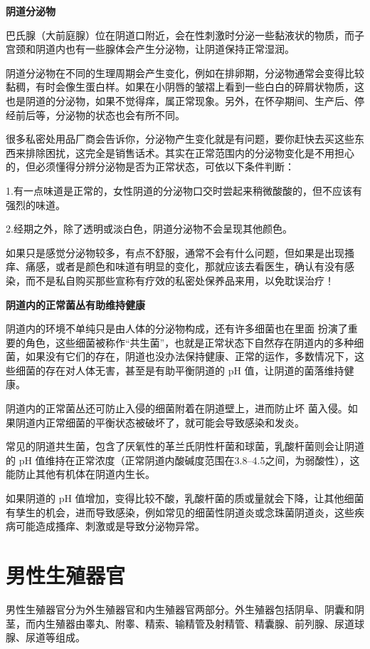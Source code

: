 \documentclass[12pt,UTF8]{ctexbook}
\begin{document}
\textbf{阴道分泌物}

巴氏腺（大前庭腺）位在阴道口附近，会在性刺激时分泌一些黏液状的物质，而子宫颈和阴道内也有一些腺体会产生分泌物，让阴道保持正常湿润。

阴道分泌物在不同的生理周期会产生变化，例如在排卵期，分泌物通常会变得比较黏稠，有时会像生蛋白样。如果在小阴唇的皱褶上看到一些白白的碎屑状物质，这也是阴道的分泌物，如果不觉得痒，属正常现象。另外，在怀孕期间、生产后、停经前后等，分泌物的状态也会有所不同。

很多私密处用品厂商会告诉你，分泌物产生变化就是有问题，要你赶快去买这些东西来排除困扰，这完全是销售话术。其实在正常范围内的分泌物变化是不用担心的，但必须懂得分辨分泌物是否为正常状态，可依以下条件判断：

1.有一点味道是正常的，女性阴道的分泌物口交时尝起来稍微酸酸的，但不应该有强烈的味道。

2.经期之外，除了透明或淡白色，阴道分泌物不会呈现其他颜色。

如果只是感觉分泌物较多，有点不舒服，通常不会有什么问题，但如果是出现搔痒、痛感，或者是颜色和味道有明显的变化，那就应该去看医生，确认有没有感染，而不是私自购买那些宣称有疗效的私密处保养品来用，以免耽误治疗！

\textbf{阴道内的正常菌丛有助维持健康}

阴道内的环境不单纯只是由人体的分泌物构成，还有许多细菌也在里面
扮演了重要的角色，这些细菌被称作“共生菌”，也就是正常状态下自然存在阴道内的多种细菌，如果没有它们的存在，阴道也没办法保持健康、正常的运作，多数情况下，这些细菌的存在对人体无害，甚至是有助平衡阴道的 pH 值，让阴道的菌落维持健康。

阴道内的正常菌丛还可防止入侵的细菌附着在阴道壁上，进而防止坏
菌入侵。如果阴道内正常细菌的平衡状态被破坏了，就可能会导致感染和发炎。

常见的阴道共生菌，包含了厌氧性的革兰氏阴性杆菌和球菌，乳酸杆菌则会让阴道的 pH 值维持在正常浓度（正常阴道内酸碱度范围在3.8--4.5之间，为弱酸性），这能防止其他有机体在阴道内生长。

如果阴道的 pH 值增加，变得比较不酸，乳酸杆菌的质或量就会下降，让其他细菌有孳生的机会，进而导致感染，例如常见的细菌性阴道炎或念珠菌阴道炎，这些疾病可能造成搔痒、刺激或是导致分泌物异常。

\chapter{男性生殖器官}

男性生殖器官分为外生殖器官和内生殖器官两部分。外生殖器包括阴阜、阴囊和阴茎，而内生殖器由睾丸、附睾、精索、输精管及射精管、精囊腺、前列腺、尿道球腺、尿道等组成。
\end{document}
